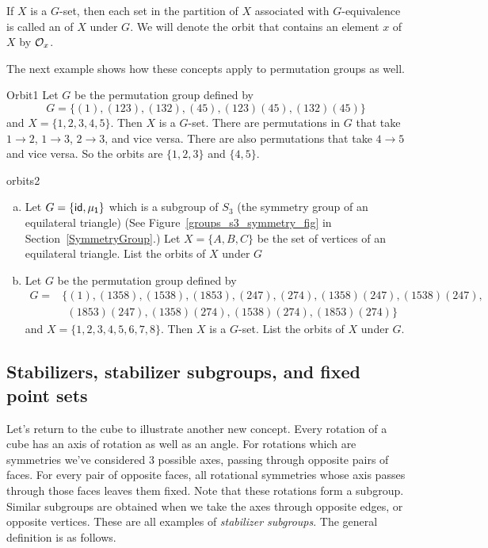 \begin{defn} \label{noteorbit}
If $X$ is a $G$-set, then each set in the partition of $X$ associated with
$G$-equivalence is called an of $X$ under $G$. We will denote the orbit that contains an element $x$ of $X$ by
${\cal O}_x$. 
\end {defn}
The next example shows how these concepts apply to permutation groups as well.

\begin{example}{Orbit1}
Let $G$ be the permutation group defined by
\[
G =\{(1), (1 23), (1 3 2), (4 5), (1 2 3)(4 5), (1 3 2)(4 5) \}
\]
and $X = \{ 1, 2, 3, 4, 5\}$. Then $X$ is a $G$-set. There are permutations in $G$ that take $1\rightarrow2$, $1\rightarrow3$, $2\rightarrow3$, and vice versa. There are also permutations that take $4\rightarrow 5$ and vice versa.  So the orbits are $\{1, 2, 3\}$ and $\{4, 5\}$. 
\end{example} 
 
\begin{exercise}{orbits2}
\begin{enumerate}[(a)]
\item Let $G=\{\sf{id},\mu_1\}$ which is a subgroup of $S_3$ (the symmetry group of an equilateral triangle) (See Figure~\ref{groups_s3_symmetry_fig} in Section~\ref{SymmetryGroup}.) Let $X=\{A,B,C\}$ be the set of vertices of an equilateral triangle. List the orbits of $X$ under $G$
\item Let $G$ be the permutation group defined by
\begin{align*}
G =&\{(1), (1358),(1538), (1853), (247),(274), (1358)(247),(1538)(247),\\
&~~ (1853)(247),(1358)(274),(1538)(274),(1853)(274) \}
\end{align*}
and $X = \{ 1, 2, 3, 4, 5,6,7,8\}$. Then $X$ is a $G$-set.  List the orbits of $X$ under $G$.
\end{enumerate}
\end {exercise}


\subsection{Stabilizers, stabilizer subgroups, and fixed point sets}

 Let's return to the cube to illustrate another new concept. Every rotation of a cube has an axis of rotation as well as an angle.   
 For rotations which are symmetries we've considered 3 possible axes, passing through opposite pairs of faces. 
For every pair of opposite faces, all rotational symmetries whose axis passes through those faces leaves them fixed.   Note that these rotations form a subgroup.  Similar subgroups are obtained when we take the axes through opposite edges, or opposite vertices. These are all examples of \emph{stabilizer subgroups}. The general definition is as follows.

